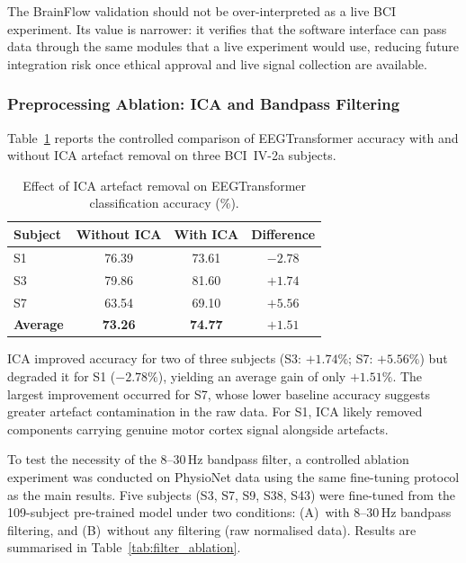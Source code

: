 \documentclass[12pt, a4paper]{article}
\begin{document}
The BrainFlow validation should not be over-interpreted as a live BCI experiment. Its value is narrower: it verifies that the software interface can pass data through the same modules that a live experiment would use, reducing future integration risk once ethical approval and live signal collection are available.

\subsubsection{Preprocessing Ablation: ICA and Bandpass Filtering}
\label{sec:ica_results}
\label{sec:res_preproc}

Table~\ref{tab:ica_comparison} reports the controlled comparison of EEGTransformer accuracy with and without ICA artefact removal on three BCI~IV-2a subjects.

\begin{table}[htbp]
\centering
\caption{Effect of ICA artefact removal on EEGTransformer classification accuracy (\%).}
\label{tab:ica_comparison}
\begin{tabular}{lccc}
\toprule
\textbf{Subject} & \textbf{Without ICA} & \textbf{With ICA} & \textbf{Difference} \\
\midrule
S1 & 76.39 & 73.61 & $-2.78$ \\
S3 & 79.86 & 81.60 & $+1.74$ \\
S7 & 63.54 & 69.10 & $+5.56$ \\
\midrule
\textbf{Average} & \textbf{73.26} & \textbf{74.77} & $\mathbf{+1.51}$ \\
\bottomrule
\end{tabular}
\end{table}

ICA improved accuracy for two of three subjects (S3: $+1.74\%$; S7: $+5.56\%$) but degraded it for S1 ($-2.78\%$), yielding an average gain of only $+1.51\%$. The largest improvement occurred for S7, whose lower baseline accuracy suggests greater artefact contamination in the raw data. For S1, ICA likely removed components carrying genuine motor cortex signal alongside artefacts.

To test the necessity of the 8--30\,Hz bandpass filter, a controlled ablation experiment was conducted on PhysioNet data using the same fine-tuning protocol as the main results. Five subjects (S3, S7, S9, S38, S43) were fine-tuned from the 109-subject pre-trained model under two conditions: (A)~with 8--30\,Hz bandpass filtering, and (B)~without any filtering (raw normalised data). Results are summarised in Table~\ref{tab:filter_ablation}.
\end{document}
